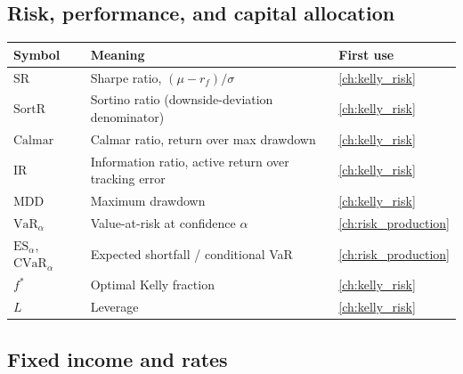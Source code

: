 \subsection{Risk, performance, and capital allocation}

\begin{longtable}{@{}l >{\raggedright\arraybackslash}p{} l@{}}
\toprule
\textbf{Symbol} & \textbf{Meaning} & \textbf{First use} \\
\midrule
\endhead
$\text{SR}$ & Sharpe ratio, $(\mu - r_f)/\sigma$ & \cref{ch:kelly_risk} \\
$\text{SortR}$ & Sortino ratio (downside-deviation denominator) & \cref{ch:kelly_risk} \\
$\text{Calmar}$ & Calmar ratio, return over max drawdown & \cref{ch:kelly_risk} \\
$\text{IR}$ & Information ratio, active return over tracking error & \cref{ch:kelly_risk} \\
$\text{MDD}$ & Maximum drawdown & \cref{ch:kelly_risk} \\
$\text{VaR}_\alpha$ & Value-at-risk at confidence $\alpha$ & \cref{ch:risk_production} \\
$\text{ES}_\alpha$, $\text{CVaR}_\alpha$ & Expected shortfall / conditional VaR & \cref{ch:risk_production} \\
$f^*$ & Optimal Kelly fraction & \cref{ch:kelly_risk} \\
$L$ & Leverage & \cref{ch:kelly_risk} \\
\bottomrule
\end{longtable}

\subsection{Fixed income and rates}

